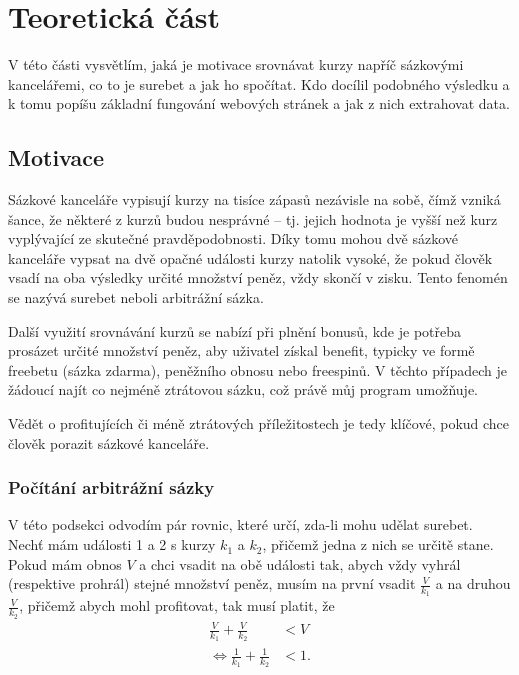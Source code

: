 \documentclass[11pt,a4paper,twoside,openright]{report}
\begin{document}


\setcounter{tocdepth}{2}
\tableofcontents
\chapter{Teoretická část}
\pagestyle{fancy}

V této části vysvětlím, jaká je motivace srovnávat kurzy napříč sázkovými kancelářemi, co to je surebet a jak ho spočítat. Kdo docílil podobného výsledku a k tomu popíšu základní fungování webových stránek a jak z nich extrahovat data.

\section{Motivace}

Sázkové kanceláře vypisují kurzy na tisíce zápasů nezávisle na sobě, čímž vzniká šance, že některé z kurzů budou nesprávné – tj. jejich hodnota je vyšší než kurz vyplývající ze skutečné pravděpodobnosti. Díky tomu mohou dvě sázkové kanceláře vypsat na dvě opačné události kurzy natolik vysoké, že pokud člověk vsadí na oba výsledky určité množství peněz, vždy skončí v zisku. Tento fenomén se nazývá surebet neboli arbitrážní sázka. 

Další využití srovnávání kurzů se nabízí při plnění bonusů, kde je potřeba prosázet určité množství peněz, aby uživatel získal benefit, typicky ve formě freebetu (sázka zdarma), peněžního obnosu nebo freespinů. V těchto případech je žádoucí najít co nejméně ztrátovou sázku, což právě můj program umožňuje. 

Vědět o profitujících či méně ztrátových příležitostech je tedy klíčové, pokud chce člověk porazit sázkové kanceláře.

\subsection{Počítání arbitrážní sázky}

V této podsekci odvodím pár rovnic, které určí, zda-li mohu udělat surebet. Nechť mám události 1 a 2 s kurzy $k_1$ a $k_2$, přičemž jedna z nich se určitě stane. Pokud mám obnos $V$ a chci vsadit na obě události tak, abych vždy vyhrál (respektive prohrál) stejné množství peněz, musím	 na první vsadit $\frac{V}{k_1}$ a na druhou $ \frac{V}{k_2}$, přičemž abych mohl profitovat, tak musí platit, že
\begin{equation}
	\begin{split}
	\frac{V}{k_1} + \frac{V}{k_2}  &< V \\
\Leftrightarrow \frac{1}{k_1} + \frac{1}{k_2} &< 1.
	\end{split}
\end{equation}
\end{document}
